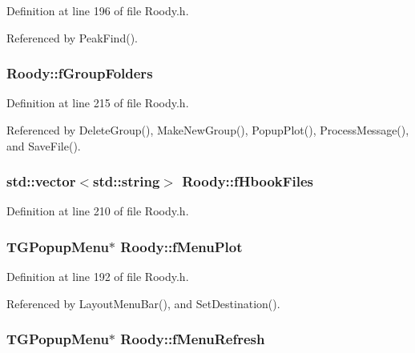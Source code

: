 Definition at line 196 of file Roody.h.

Referenced by PeakFind().
\subsubsection[{fGroupFolders}]{ {\bf Roody::fGroupFolders}\hspace{0.3cm}{\ttfamily  [private]}}\label{classRoody_a61aeb013dc199a8ed4fd57e140adab6a}


Definition at line 215 of file Roody.h.

Referenced by DeleteGroup(), MakeNewGroup(), PopupPlot(), ProcessMessage(), and SaveFile().
\subsubsection[{fHbookFiles}]{\setlength{\rightskip}{0pt plus 5cm}std::vector$<$std::string$>$ {\bf Roody::fHbookFiles}\hspace{0.3cm}{\ttfamily  [private]}}\label{classRoody_a60a66e11c2b5edc58bf31f89d859b021}


Definition at line 210 of file Roody.h.
\subsubsection[{fMenuPlot}]{\setlength{\rightskip}{0pt plus 5cm}TGPopupMenu$\ast$ {\bf Roody::fMenuPlot}\hspace{0.3cm}{\ttfamily  [private]}}\label{classRoody_aeb8acfcf28d286fb41a24cdb7062f993}


Definition at line 192 of file Roody.h.

Referenced by LayoutMenuBar(), and SetDestination().
\subsubsection[{fMenuRefresh}]{\setlength{\rightskip}{0pt plus 5cm}TGPopupMenu$\ast$ {\bf Roody::fMenuRefresh}\hspace{0.3cm}{\ttfamily  [private]}}\label{classRoody_a1d94b444813ea45ad4fc0eb2887c2372}



